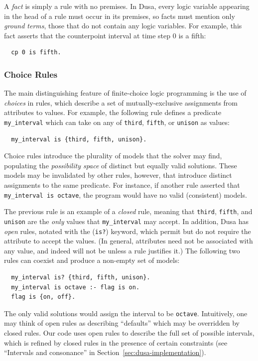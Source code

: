 A {\em fact} is simply a rule with no premises. In Dusa,
every logic variable appearing in the head of a rule must
occur in its premises, so facts must mention only {\em ground terms}, those
that do not contain any logic variables. For example, this fact
asserts that the counterpoint interval at time step $0$ is a fifth:

\begin{verbatim}
  cp 0 is fifth.
\end{verbatim}

\subsubsection{Choice Rules}

The main distinguishing feature of finite-choice logic
programming is the use of {\em choices} in rules, which
describe a set of mutually-exclusive assignments from
attributes to values. For example, the following rule
defines a predicate \verb|my_interval| which can take on
any of \verb|third|, \verb|fifth|, or \verb|unison|
as values:

\begin{verbatim}
  my_interval is {third, fifth, unison}.
\end{verbatim}

Choice rules introduce the plurality of models that the
solver may find, populating the {\em possibility space}
of distinct but equally valid solutions. These models
may be invalidated by other rules, however, that introduce
distinct assignments to the same predicate. For instance, if
another rule asserted that \verb|my_interval is octave|,
the program would have no valid (consistent) models.

The previous rule is an example of a {\em closed} rule,
meaning that \verb|third|, \verb|fifth|, and \verb|unison|
are the {\em only} values that \verb|my_interval| may
accept.
In addition, Dusa has {\em open} rules, notated with the
(\verb|is?|) keyword, which permit
but do not require the attribute to accept the values.
(In general, attributes need not be associated with any value,
and indeed will not be unless a rule justifies it.)
The following two rules can coexist and produce a non-empty
set of models:

\begin{verbatim}
  my_interval is? {third, fifth, unison}.
  my_interval is octave :- flag is on.
  flag is {on, off}.
\end{verbatim}

The only valid solutions would assign the interval
to be \verb|octave|. Intuitively, one may think of open
rules as describing ``defaults'' which may be overridden
by closed rules. Our code uses open rules to describe the
full set of possible intervals, which is refined
by closed rules in the presence of certain constraints
(see ``Intervals and consonance'' in Section~\ref{sec:dusa-implementation}).

